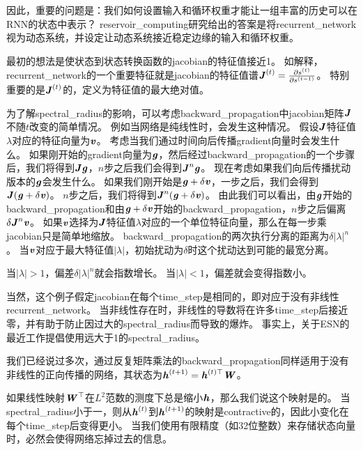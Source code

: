 因此，重要的问题是：我们如何设置输入和循环权重才能让一组丰富的历史可以在\gls{RNN}的状态中表示？
\gls{reservoir_computing}研究给出的答案是将\gls{recurrent_network}视为动态系统，并设定让动态系统接近稳定边缘的输入和循环权重。

最初的想法是使状态到状态转换函数的\gls{jacobian}的特征值接近1。
如解释，\gls{recurrent_network}的一个重要特征就是\gls{jacobian}的特征值谱$\boldsymbol{\mathit{J}}^{(t)} = \frac{\partial s^{(t)}}{\partial s^{(t-1)}}$。
特别重要的是$\boldsymbol{\mathit{J}}^{(t)}$的，定义为特征值的最大绝对值。

为了解\gls{spectral_radius}的影响，可以考虑\gls{backward_propagation}中\gls{jacobian}矩阵$\boldsymbol{\mathit{J}}$不随$t$改变的简单情况。
例如当网络是纯线性时，会发生这种情况。
假设$\boldsymbol{\mathit{J}}$特征值$\lambda$对应的特征向量为$\boldsymbol{\mathit{v}}$。
考虑当我们通过时间向后传播\gls{gradient}向量时会发生什么。
如果刚开始的\gls{gradient}向量为$\boldsymbol{\mathit{g}}$，然后经过\gls{backward_propagation}的一个步骤后，我们将得到$\boldsymbol{\mathit{J}} \boldsymbol{\mathit{g}}$，$n$步之后我们会得到$\boldsymbol{\mathit{J}}^n \boldsymbol{\mathit{g}}$。
现在考虑如果我们向后传播扰动版本的$\boldsymbol{\mathit{g}}$会发生什么。
如果我们刚开始是$\boldsymbol{\mathit{g}} + \delta \boldsymbol{\mathit{v}}$，一步之后，我们会得到$\boldsymbol{\mathit{J}}(\boldsymbol{\mathit{g}} + \delta \boldsymbol{\mathit{v}})$。
$n$步之后，我们将得到$\boldsymbol{\mathit{J}}^n(\boldsymbol{\mathit{g}} + \delta \boldsymbol{\mathit{v}})$。
由此我们可以看出，由$\boldsymbol{\mathit{g}}$开始的\gls{backward_propagation}和由$\boldsymbol{\mathit{g}}+\delta \boldsymbol{\mathit{v}}$开始的\gls{backward_propagation}，$n$步之后偏离$\delta \boldsymbol{\mathit{J}}^n \boldsymbol{\mathit{v}}$。
如果$\boldsymbol{\mathit{v}}$选择为$\boldsymbol{\mathit{J}}$特征值$\lambda$对应的一个单位特征向量，那么在每一步乘\gls{jacobian}只是简单地缩放。
\gls{backward_propagation}的两次执行分离的距离为$\delta | \lambda |^n$。
当$\boldsymbol{\mathit{v}}$对应于最大特征值$|\lambda|$，初始扰动为$\delta$时这个扰动达到可能的最宽分离。

当$ | \lambda | > 1$，偏差$\delta | \lambda |^n$就会指数增长。
当$ | \lambda | < 1$，偏差就会变得指数小。


当然，这个例子假定\gls{jacobian}在每个\gls{time_step}是相同的，即对应于没有非线性\gls{recurrent_network}。
当非线性存在时，非线性的导数将在许多\gls{time_step}后接近零，并有助于防止因过大的\gls{spectral_radius}而导致的爆炸。
事实上，关于\gls{ESN}的最近工作提倡使用远大于1的\gls{spectral_radius}\citep{yildiz2012re,jaeger2012long}。

我们已经说过多次，通过反复矩阵乘法的\gls{backward_propagation}同样适用于没有非线性的正向传播的网络，其状态为$\boldsymbol{\mathit{h}}^{(t+1)} = \boldsymbol{\mathit{h}}^{(t)\top} \boldsymbol{\mathit{W}} $。

如果线性映射$\boldsymbol{\mathit{W}}^\top$在$L^2$范数的测度下总是缩小$\boldsymbol{\mathit{h}}$，那么我们说这个映射是的。
当\gls{spectral_radius}小于一，则从$\boldsymbol{\mathit{h}}^{(t)}$到$\boldsymbol{\mathit{h}}^{(t+1)}$的映射是\gls{contractive}的，因此小变化在每个\gls{time_step}后变得更小。
当我们使用有限精度（如32位整数）来存储状态向量时，必然会使得网络忘掉过去的信息。

